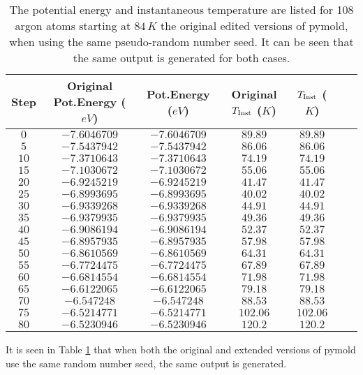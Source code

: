 \documentclass{article}
\begin{document}
\begin{table}[h!t]
\centering
\caption{ The potential energy and instantaneous temperature are listed for 108 argon atoms starting at $84\,K$ the original edited versions of pymold, when using the same pseudo-random number seed. It can be seen that the same output is generated for both cases. \label{table:sameSeed}}
\begin{tabular}{|c|c|c|c|c|c|c| } 
\hline
Step & Original Pot.Energy ($eV$)& Pot.Energy ($eV$) & Original $T_{\rm{Inst}}$ ($K$) & $T_{\rm{Inst}}$ ($K$)
\\\hline
$0$	& $-7.6046709$ & $-7.6046709$ & $89.89$ & $89.89$ \\
$5$	& $-7.5437942$ & $-7.5437942$ & $86.06$ & $86.06$ \\
$10$ & $-7.3710643$ & $-7.3710643$ & $74.19$ & $74.19$ \\
$15$ & $-7.1030672$ & $-7.1030672$ & $55.06$ & $55.06$ \\
$20$ & $-6.9245219$ & $-6.9245219$ & $41.47$ & $41.47$ \\
$25$ & $-6.8993695$ & $-6.8993695$ & $40.02$ & $40.02$ \\
$30$ & $-6.9339268$ & $-6.9339268$ & $44.91$ & $44.91$ \\
$35$ & $-6.9379935$ & $-6.9379935$ & $49.36$ & $49.36$ \\
$40$ & $-6.9086194$ & $-6.9086194$ & $52.37$ & $52.37$ \\
$45$ & $-6.8957935$ & $-6.8957935$ & $57.98$ & $57.98$ \\
$50$ & $-6.8610569$ & $-6.8610569$ & $64.31$ & $64.31$ \\
$55$ & $-6.7724475$ & $-6.7724475$ & $67.89$ & $67.89$ \\
$60$ & $-6.6814554$ & $-6.6814554$ & $71.98$ & $71.98$ \\
$65$ & $-6.6122065$ & $-6.6122065$ & $79.18$ & $79.18$ \\
$70$ & $-6.547248$ & $-6.547248$ & $88.53$ & $88.53$ \\
$75$ & $-6.5214771$ & $-6.5214771$ & $102.06$ & $102.06$ \\
$80$ & $-6.5230946$ & $-6.5230946$ & $120.2$ & $120.2$ \\\hline
\end{tabular}
\end{table} 

It is seen in Table \ref{table:sameSeed} that when both the original and extended versions of pymold use the same random number seed, the same output is generated. 
\end{document}
